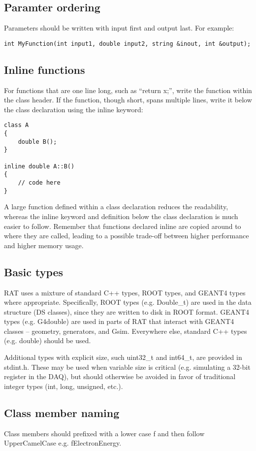 \subsection{Paramter ordering}
Parameters should be written with input first and output last. For example:
\begin{verbatim}
int MyFunction(int input1, double input2, string &inout, int &output);
\end{verbatim} 

\subsection{Inline functions}
For functions that are one line long, such as ``return x;'', write the function within the class header. If the function, though short, spans multiple lines, write it below the class declaration using the inline keyword:
\begin{verbatim}
class A
{
    double B();
}

inline double A::B()
{
    // code here
}
\end{verbatim}
A large function defined within a class declaration reduces the readability, whereas the inline keyword and definition below the class declaration is much easier to follow. Remember that functions declared inline are copied around to where they are called, leading to a possible trade-off between higher performance and higher memory usage.

\subsection{Basic types}
RAT uses a mixture of standard C++ types, ROOT types, and GEANT4 types where appropriate. Specifically, ROOT types (e.g. Double\_t) are used in the data structure (DS classes), since they are written to disk in ROOT format. GEANT4 types (e.g. G4double) are used in parts of RAT that interact with GEANT4 classes -- geometry, generators, and Gsim. Everywhere else, standard C++ types (e.g. double) should be used.

Additional types with explicit size, such uint32\_t and int64\_t,  are provided in stdint.h. These may be used when variable size is critical (e.g. simulating a 32-bit register in the DAQ), but should otherwise be avoided in favor of traditional integer types (int, long, unsigned, etc.).
\subsection{Class member naming}
Class members should prefixed with a lower case f and then follow UpperCamelCase e.g. fElectronEnergy.

